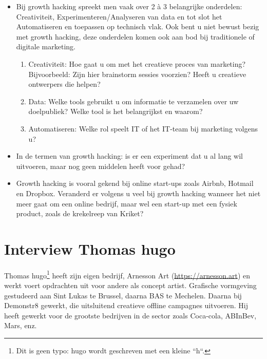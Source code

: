 \begin{itemize}
	
	
	\item Bij growth hacking spreekt men vaak over 2 à 3 belangrijke onderdelen: Creativiteit, Experimenteren/Analyseren van data en tot slot het Automatiseren en toepassen op technisch vlak. Ook bent u niet bewust bezig met growth hacking, deze onderdelen komen ook aan bod bij traditionele of digitale marketing.
	\begin{enumerate}[label*=\arabic*.]
		\item Creativiteit: Hoe gaat u om met het creatieve proces van marketing? Bijvoorbeeld: Zijn hier brainstorm sessies voorzien? Heeft u creatieve ontwerpers die helpen?
		
		
		
		\item Data: Welke tools gebruikt u om informatie te verzamelen over uw doelpubliek? Welke tool is het belangrijkst en waarom?
		
		
		
		\item Automatiseren: Welke rol speelt IT of het IT-team bij marketing volgens u? 
		
		
		
	\end{enumerate}
	\item In de termen van growth hacking: is er een experiment dat u al lang wil uitvoeren, maar nog geen middelen heeft voor gehad?
	
	
	
	\item Growth hacking is vooral gekend bij online start-ups zoals Airbnb, Hotmail en Dropbox. Veranderd er volgens u veel bij growth hacking wanneer het niet meer gaat om een online bedrijf, maar wel een start-up met een fysiek product, zoals de krekelreep van Kriket?
	
	
	
\end{itemize}


\section{Interview Thomas hugo}
\label{sec:interview-thomas-hugo}

Thomas hugo\footnote{Dit is geen typo: hugo wordt geschreven met een kleine ``h``. } heeft zijn eigen bedrijf, Arnesson Art (\href{https://arnesson.art/}{https://arnesson.art}) en werkt voert opdrachten uit voor andere als concept artist. Grafische vormgeving gestudeerd aan Sint Lukas te Brussel, daarna BAS te Mechelen. Daarna bij Demonstr8 gewerkt, die uitsluitend creatieve offline campagnes uitvoeren. Hij heeft gewerkt voor de grootste bedrijven in de sector zoals Coca-cola, ABInBev, Mars, enz.

